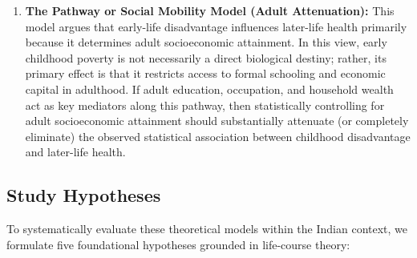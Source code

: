 \begin{enumerate}[label=(\alph*)]
    \item \textbf{The Pathway or Social Mobility Model (Adult Attenuation):}
    This model argues that early-life disadvantage influences later-life health primarily because it determines adult socioeconomic attainment. In this view, early childhood poverty is not necessarily a direct biological destiny; rather, its primary effect is that it restricts access to formal schooling and economic capital in adulthood. If adult education, occupation, and household wealth act as key mediators along this pathway, then statistically controlling for adult socioeconomic attainment should substantially attenuate (or completely eliminate) the observed statistical association between childhood disadvantage and later-life health.
\end{enumerate}

\subsection{Study Hypotheses}
To systematically evaluate these theoretical models within the Indian context, we formulate five foundational hypotheses grounded in life-course theory:

